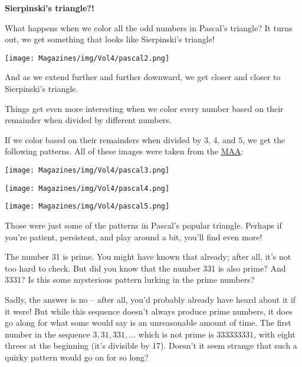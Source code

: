 \documentclass{article}
\begin{document}
\begin{multicols}{3}
\textbf{Sierpinski's triangle?!}

What happens when we color all the odd numbers in Pascal's triangle? It turns out, we get something that looks like Sierpinski's triangle! 

\begin{center}
	\texttt{[image: Magazines/img/Vol4/pascal2.png]}
\end{center}

And as we extend further and further downward, we get closer and closer to Sierpinski's triangle.

Things get even more interesting when we color every number based on their remainder when divided by different numbers. 

If we color based on their remainders when divided by $3$, $4$, and $5$, we get the following patterns. All of these images were taken from the \href{https://www.maa.org/press/periodicals/loci/joma/patterns-in-pascals-triangle-with-a-twist-first-twist-what-is-it}{MAA}:


\begin{center}
	\texttt{[image: Magazines/img/Vol4/pascal3.png]}
\end{center}

\begin{center}
	\texttt{[image: Magazines/img/Vol4/pascal4.png]}
\end{center}

\begin{center}
	\texttt{[image: Magazines/img/Vol4/pascal5.png]}
\end{center}


Those were just some of the patterns in Pascal's popular triangle. Perhaps if you're patient, persistent, and play around a bit, you'll find even more!

\closearticle
{}
The number 31 is prime. You might have known that already; after all, it’s not too hard to check. But did you know that the number 331 is also prime? And 3331? Is this some mysterious pattern lurking in the prime numbers?
	
Sadly, the answer is no – after all, you’d probably already have heard about it if it were! But while this sequence doesn’t always produce prime numbers, it does go along for what some would say is an unreasonable amount of time. The first number in the sequence $3, 31, 331, …$ which is not prime is $333333331$, with eight threes at the beginning (it’s divisible by 17). Doesn’t it seem strange that such a quirky pattern would go on for so long?
	 

\end{multicols}
\end{document}
